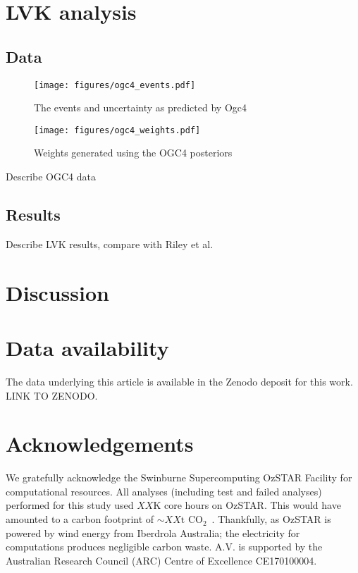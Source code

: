 \documentclass[twocolumn]{aastex631}
\begin{document}
\section{LVK analysis}
\subsection{Data}

\begin{figure}[ht!]
    \begin{centering}
        \texttt{[image: figures/ogc4\_events.pdf]}
        \caption{
            The events and uncertainty as predicted by Ogc4
        }
        \label{fig:ogc4_events}
    \end{centering}
\end{figure}

\begin{figure}[ht!]
    \begin{centering}
        \texttt{[image: figures/ogc4\_weights.pdf]}
        \caption{
            Weights generated using the OGC4 posteriors
        }
        \label{fig:ogc4_weights}
    \end{centering}
\end{figure}

Describe OGC4 data

\subsection{Results}
Describe LVK results, compare with Riley et al.

\section{Discussion}



\section*{Data availability}
The data underlying this article is available in the Zenodo deposit for this work. LINK TO ZENODO.

\section*{Acknowledgements}
We gratefully acknowledge the Swinburne Supercomputing OzSTAR Facility for computational resources. All analyses (including test and failed analyses) performed for this study used $XX$K core hours on OzSTAR. This would have amounted to a carbon footprint of ${\sim XX{\text{t CO}_2}}$~\citep{greenhouse, energy_to_co2_converter}. Thankfully, as OzSTAR is powered by wind energy from Iberdrola Australia; the electricity for computations produces negligible carbon waste.
A.V. is supported by the Australian Research Council (ARC) Centre of Excellence CE170100004.
\end{document}
